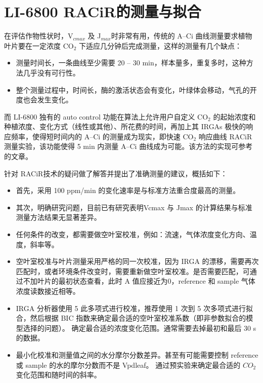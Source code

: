 \documentclass[]{krantz}
\makeatletter
\newenvironment{Shaded}{\begin{snugshade}}{\end{snugshade}}
\newcommand{\StringTok}[1]{\textcolor[rgb]{0.31,0.60,0.02}{#1}}
\newcommand{\OperatorTok}[1]{\textcolor[rgb]{0.81,0.36,0.00}{\textbf{#1}}}
\newcommand{\NormalTok}[1]{#1}
\providecommand{\tightlist}{%
  \setlength{\itemsep}{0pt}\setlength{\parskip}{0pt}}
\newenvironment{kframe}{%
\medskip{}
\setlength{\fboxsep}{.8em}
 \def\at@end@of@kframe{}%
 \ifinner\ifhmode%
  \def\at@end@of@kframe{\end{minipage}}%
  \begin{minipage}{\columnwidth}%
 \fi\fi%
 \def\FrameCommand##1{\hskip\@totalleftmargin \hskip-\fboxsep
 \colorbox{shadecolor}{##1}\hskip-\fboxsep
     \hskip-\linewidth \hskip-\@totalleftmargin \hskip\columnwidth}%
 \MakeFramed {\advance\hsize-\width
   \@totalleftmargin\z@ \linewidth\hsize
   \@setminipage}}%
 {\par\unskip\endMakeFramed%
 \at@end@of@kframe}
\renewenvironment{Shaded}{\begin{kframe}}{\end{kframe}}
\theoremstyle{definition}
\theoremstyle{definition}
\theoremstyle{definition}
\theoremstyle{remark}
\makeatother
\begin{document}
\begin{Shaded}
\end{Shaded}

\section{\texorpdfstring{LI-6800
RACiR\texttrademark 的测量与拟合}{LI-6800 RACiR的测量与拟合}}\label{racir68}

在评估作物性状时，V\(_{cmax}\) 及 J\(_{max}\)时非常有用，传统的 A--Ci
曲线测量要求植物叶片要在一定浓度 CO\(_{2}\)
下适应几分钟后完成测量，这样的测量有几个缺点：

\begin{itemize}
\tightlist
\item
  测量时间长，一条曲线至少需要 20 -- 30
  min，样本量多，重复多时，这种方法几乎没有可行性。
\item
  整个测量过程中，时间长，酶的激活状态会有变化，叶绿体会移动，气孔的开度也会发生变化。
\end{itemize}

而 LI-6800 独有的 auto control 功能在算法上允许用户自定义 CO\(_{2}\)
的起始浓度和种植浓度、变化方式（线性或其他）、所花费的时间，再加上其
IRGAs 极快的响应频率，使得短时间内的 A--Ci 的测量成为现实，即快速
CO\(_{2}\) 响应曲线 RACiR\texttrademark
测量实验，该功能使得 5 min 内测量 A--Ci 曲线成为可能。该方法的实现可参考
\citet{Stinziano2017} 的文章。

\citet{stinziano2018} 针对
RACiR\texttrademark 技术的疑问做了解答并提出了准确测量的建议，概括如下：

\begin{itemize}
\tightlist
\item
  首先，采用 100 ppm/min 的变化速率是与标准方法重合度最高的测量。
\item
  其次，明确研究问题，目前已有研究表明Vcmax 与 Jmax
  的计算结果与标准测量方法结果无显著差异。
\item
  任何条件的改变，都需要做空叶室校准，例如：流速，气体浓度变化方向、温度，斜率等。
\item
  空叶室校准与叶片测量采用严格的同一次校准，因为 IRGA
  的漂移，需要再次匹配时，或者环境条件改变时，需要重新做空叶室校准。是否需要匹配，可通过不加叶片的最初状态查看，此时
  A 值应接近为0，reference 和 sample 气体浓度读数接近相等。
\item
  IRGA 分析器使用 5 此多项式进行校准，推荐使用 1 次到 5
  次多项式进行拟合，然后根据 BIC
  指数来确定最合适的空叶室校准系数（即非参数拟合的模型选择的问题）。
  确定最合适的浓度变化范围。通常需要去掉最初和最后 30 s的数据。
\item
  最小化校准和测量值之间的水分摩尔分数差异。甚至有可能需要控制 reference
  或 sample 的水的摩尔分数而不是 Vpdleaf。 通过预实验来确定最合适的
  \(CO_2\) 变化范围和随时间的斜率。
\end{itemize}
\end{document}
